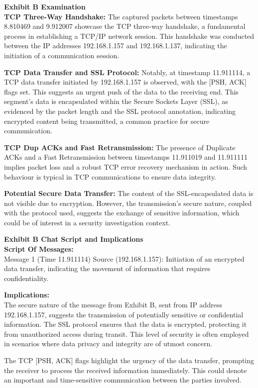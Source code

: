 \textbf{Exhibit B Examination}\\
\textbf{TCP Three-Way Handshake:} The captured packets between timestamps 8.810469 and 9.912007 showcase the TCP three-way handshake, a fundamental process in establishing a TCP/IP network session. This handshake was conducted between the IP addresses 192.168.1.157 and 192.168.1.137, indicating the initiation of a communication session.

\textbf{TCP Data Transfer and SSL Protocol:} Notably, at timestamp 11.911114, a TCP data transfer initiated by 192.168.1.157 is observed, with the [PSH, ACK] flags set. This suggests an urgent push of the data to the receiving end. This segment's data is encapsulated within the Secure Sockets Layer (SSL), as evidenced by the packet length and the SSL protocol annotation, indicating encrypted content being transmitted, a common practice for secure communication.

\textbf{TCP Dup ACKs and Fast Retransmission:} The presence of Duplicate ACKs and a Fast Retransmission between timestamps 11.911019 and 11.911111 implies packet loss and a robust TCP error recovery mechanism in action. Such behaviour is typical in TCP communications to ensure data integrity.

\textbf{Potential Secure Data Transfer:} The content of the SSL-encapsulated data is not visible due to encryption. However, the transmission's secure nature, coupled with the protocol used, suggests the exchange of sensitive information, which could be of interest in a security investigation context.

\textbf{Exhibit B Chat Script and Implications}\\
\textbf{Script Of Messages:}\\
Message 1 (Time 11.911114) Source (192.168.1.157): Initiation of an encrypted data transfer, indicating the movement of information that requires confidentiality.

\textbf{Implications:}\\
The secure nature of the message from Exhibit B, sent from IP address 192.168.1.157, suggests the transmission of potentially sensitive or confidential information. The SSL protocol ensures that the data is encrypted, protecting it from unauthorized access during transit. This level of security is often employed in scenarios where data privacy and integrity are of utmost concern.

The TCP [PSH, ACK] flags highlight the urgency of the data transfer, prompting the receiver to process the received information immediately. This could denote an important and time-sensitive communication between the parties involved.

